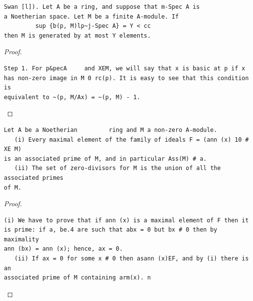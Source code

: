 \begin{theorem}\label{mcrt-auto-theorem-5-8}\uses{}
\begin{verbatim}
Swan [l]). Let A be a ring, and suppose that m-Spec A is
a Noetherian space. Let M be a finite A-module. If
         sup {b(p, M)lp~j-Spec A} = Y < cc
then M is generated by at most Y elements.
\end{verbatim}
\end{theorem}
\begin{proof}
\begin{verbatim}
Step 1. For p&pecA     and XEM, we will say that x is basic at p if x
has non-zero image in M 0 rc(p). It is easy to see that this condition is
equivalent to ~(p, M/Ax) = ~(p, M) - 1.
\end{verbatim}
\end{proof}


\begin{theorem}\label{mcrt-auto-theorem-6-1}\uses{}
\begin{verbatim}
Let A be a Noetherian         ring and M a non-zero A-module.
   (i) Every maximal element of the family of ideals F = (ann (x) 10 # XE M)
is an associated prime of M, and in particular Ass(M) # a.
   (ii) The set of zero-divisors for M is the union of all the associated primes
of M.
\end{verbatim}
\end{theorem}
\begin{proof}
\begin{verbatim}
(i) We have to prove that if ann (x) is a maximal element of F then it
is prime: if a, be.4 are such that abx = 0 but bx # 0 then by maximality
ann (bx) = ann (x); hence, ax = 0.
   (ii) If ax = 0 for some x # 0 then asann (x)EF, and by (i) there is an
associated prime of M containing arm(x). n
\end{verbatim}
\end{proof}


